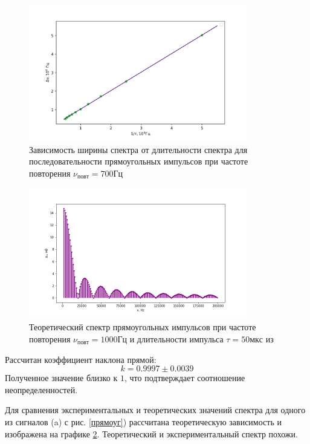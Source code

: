 \documentclass[a4paper,12pt]{article} %
\begin{document}
\begin{figure}[h!]
\begin{center}
\includegraphics[width=0.85\textwidth]{dnu(tau)}
\caption{Зависимость ширины спектра от длительности спектра для последовательности прямоугольных импульсов при частоте повторения $\nu_{повт} = 700 Гц$} \label{dnu(tau)_img}
\end{center}
\end{figure}
\begin{figure}[h!]
\begin{center}
\includegraphics[width=0.85\textwidth]{a(n)}
\caption{Теоретический спектр прямоугольных импульсов при частоте повторения $\nu_{повт} = 1000 Гц$ и длительности импульса $\tau = 50 мкс$ из \cite{labnik}} \label{теор}
\end{center}
\end{figure}
Рассчитан коэффициент наклона прямой:
\begin{equation}
k = 0.9997 \pm 0.0039
\end{equation}
Полученное значение близко к $1$, что подтверждает соотношение неопределенностей. 


Для сравнения экспериментальных и теоретических значений спектра для одного из сигналов (a) с рис. \ref{прямоуг}) рассчитана теоретическую зависимость и изображена на графике \ref{теор}. Теоретический и экспериментальный спектр похожи.
\end{document}
